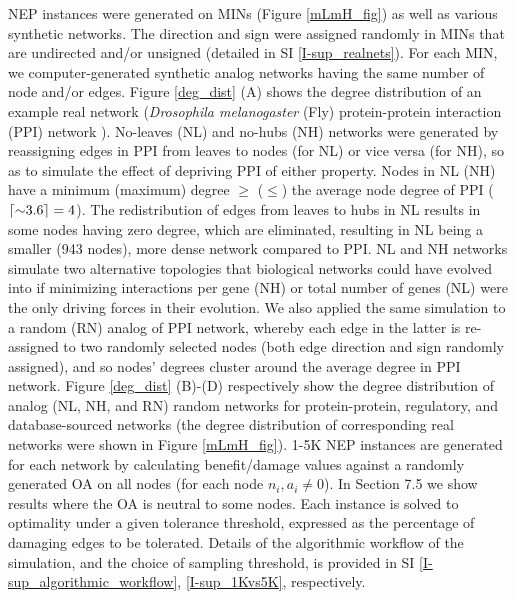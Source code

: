 \documentclass[12pt]{article}
\DeclarePairedDelimiter\ceil{\lceil}{\rceil}
\begin{document}
NEP instances were generated on MINs (Figure \ref{mLmH_fig}) as well as various synthetic networks. The direction and sign were assigned randomly in MINs that are undirected and/or unsigned (detailed in SI \ref{I-sup_realnets}). For each MIN, we computer-generated synthetic analog networks having the same number of node and/or edges. Figure \ref{deg_dist} (A) shows the degree distribution of an example real network (\textit{Drosophila melanogaster} (Fly) protein-protein interaction (PPI) network \cite{vinayagam_integrating_2014}). No-leaves (NL) and no-hubs (NH) networks were generated by reassigning edges in PPI from leaves to nodes (for NL) or vice versa (for NH), so as to simulate the effect of depriving PPI of either property. Nodes in NL (NH) have a minimum (maximum) degree  $\geq$ ($\leq$) the average node degree of PPI ($\ceil{{\sim}3.6}=4$). The redistribution of edges from leaves to hubs in NL results in some nodes having zero degree, which are eliminated, resulting in NL being a smaller (943 nodes), more dense network compared to PPI. NL and NH networks simulate two alternative topologies that biological networks could have evolved into if minimizing interactions per gene (NH) or total number of genes (NL) were the only driving forces in their evolution. We also applied the same simulation to a random (RN)  analog of PPI network, whereby each edge in the latter is re-assigned to two randomly selected nodes (both edge direction and sign randomly assigned), and so nodes' degrees cluster around the average degree in PPI network. Figure \ref{deg_dist}  (B)-(D) respectively show the degree distribution of analog (NL, NH, and RN) random networks for protein-protein, regulatory, and database-sourced networks (the degree distribution of corresponding real networks were shown in Figure \ref{mLmH_fig}). 1-5K NEP instances are generated for each network by calculating benefit/damage values against a randomly generated OA on all nodes (for each node $n_i, a_i\neq 0$). In Section 7.5 we show results where the OA is neutral to some nodes. Each instance is solved to optimality under a given tolerance threshold, expressed as the percentage of damaging edges to be tolerated. Details of the algorithmic workflow of the simulation, and the choice of sampling threshold, is provided in SI \ref{I-sup_algorithmic_workflow}, \ref{I-sup_1Kvs5K}, respectively.
\end{document}
